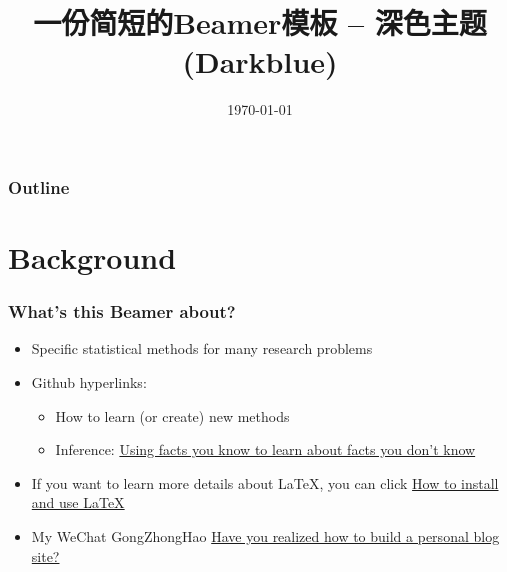 \documentclass[UTF8, aspectratio=169 , 10pt，punct=kaiming]{beamer} %
\title[Beamer of WISE Version-2]{一份简短的Beamer模板 -- 深色主题(Darkblue)}
\author[RankFan \& Gauss]{\small{RankFan\inst{1}\inst{2} \and Gauss\inst{1} \inst{2}}} %
\institute[X~M~U]{
  \inst{1}
  WISE Xiamen University (Xiamen) %
  \and
  \inst{2}
  经济知识综合(公众号)
  }
\date{\today}
\begin{document}
\frame[plain]{\titlepage}

\begin{frame}[plain]
  \frametitle{Outline}
  \tableofcontents[hideallsubsections]
\end{frame}



\section{Background}

\begin{frame}
  \frametitle{What's this Beamer about?}
  
  \begin{itemize}
    \item \alert{Specific statistical methods for many research problems}
    \item Github hyperlinks: 
      \begin{itemize}
      \item How to learn (or create) new methods
      \item Inference: \underline{Using facts you know to learn about facts you don't know}
      \end{itemize}
    \item If you want to learn more details about \LaTeX, you can click \alert{\href{https://www.cnblogs.com/RankFan/p/14987832.html}
    {How to install and use \LaTeX}}
    \item My WeChat GongZhongHao \alert{\href{https://mp.weixin.qq.com/s/UV9AEY7Nvdy4W0h1MpMl0g}
    {Have you realized how to build a personal blog site?}}
  \end{itemize}
\end{frame}
\end{document}
